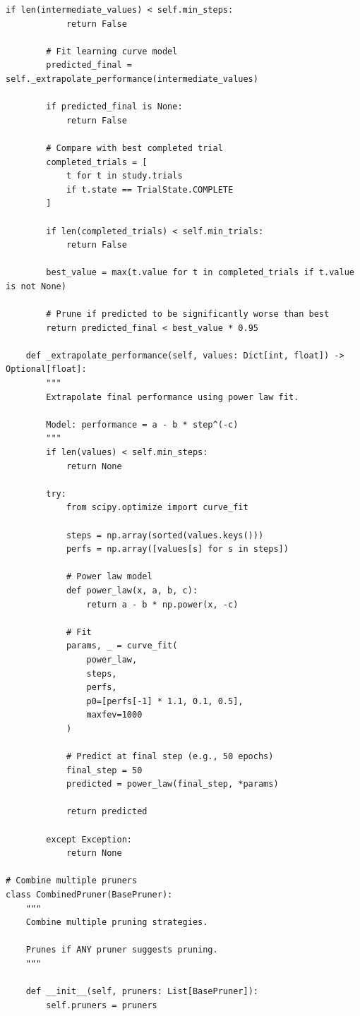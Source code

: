 \begin{lstlisting}[style=python, caption=Custom pruning strategies]
        if len(intermediate_values) < self.min_steps:
            return False

        # Fit learning curve model
        predicted_final = self._extrapolate_performance(intermediate_values)

        if predicted_final is None:
            return False

        # Compare with best completed trial
        completed_trials = [
            t for t in study.trials
            if t.state == TrialState.COMPLETE
        ]

        if len(completed_trials) < self.min_trials:
            return False

        best_value = max(t.value for t in completed_trials if t.value is not None)

        # Prune if predicted to be significantly worse than best
        return predicted_final < best_value * 0.95

    def _extrapolate_performance(self, values: Dict[int, float]) -> Optional[float]:
        """
        Extrapolate final performance using power law fit.

        Model: performance = a - b * step^(-c)
        """
        if len(values) < self.min_steps:
            return None

        try:
            from scipy.optimize import curve_fit

            steps = np.array(sorted(values.keys()))
            perfs = np.array([values[s] for s in steps])

            # Power law model
            def power_law(x, a, b, c):
                return a - b * np.power(x, -c)

            # Fit
            params, _ = curve_fit(
                power_law,
                steps,
                perfs,
                p0=[perfs[-1] * 1.1, 0.1, 0.5],
                maxfev=1000
            )

            # Predict at final step (e.g., 50 epochs)
            final_step = 50
            predicted = power_law(final_step, *params)

            return predicted

        except Exception:
            return None

# Combine multiple pruners
class CombinedPruner(BasePruner):
    """
    Combine multiple pruning strategies.

    Prunes if ANY pruner suggests pruning.
    """

    def __init__(self, pruners: List[BasePruner]):
        self.pruners = pruners


\end{lstlisting}
